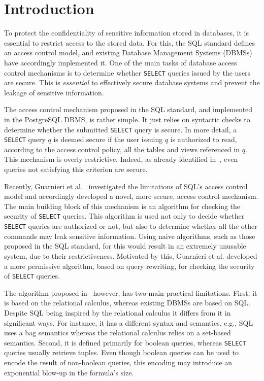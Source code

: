 \section{Introduction}
To protect the confidentiality of sensitive information stored in databases, it is essential to restrict access to the stored data.
%
For this, the SQL standard defines an access control model, and existing Database Management Systems (DBMSs) have accordingly implemented it. 
%
One of the main tasks of database access control mechanisms is to determine whether \texttt{SELECT} queries issued by the users are secure.
%
This is \emph{essential} to effectively secure database systems and prevent the leakage of sensitive information.

The access control mechanism proposed in the SQL standard, and implemented in the PostgreSQL DBMS, is rather simple.
%
It just relies on syntactic checks to determine whether the submitted \texttt{SELECT} query is secure.
%
In more detail, a \texttt{SELECT} query $q$ is deemed secure if the user issuing $q$ is authorized to read, according to the access control policy, all the tables and views referenced in $q$. %
%
This mechanism is overly restrictive.
%
Indeed, as already identified in~\cite{rizvi2004extending, guarnieri2014optimal, wang2007correctness,zhang2005authorizations}, even queries not satisfying this criterion are secure.

Recently, Guarnieri et al.~\cite{guarnieri2016strong} investigated the limitations of SQL's access control model and accordingly  developed a novel, more secure, access control mechanism.
%
The main building block of this mechanism is an algorithm for checking the security of \texttt{SELECT} queries.
%
This algorithm is used not only to decide whether \texttt{SELECT} queries are authorized or not, but also to determine whether all the other commands may leak sensitive information. 
%
Using naive algorithms, such as those proposed in the SQL standard, for this would result in an extremely unusable system, due to their restrictiveness.
%
Motivated by this, Guarnieri et al. developed a more permissive algorithm, based on query rewriting, for checking the security of \texttt{SELECT} queries.

The algorithm proposed in~\cite{guarnieri2016strong} however, has two main practical limitations.
%
First, it is based on the relational calculus, whereas existing DBMSs are based on SQL. Despite SQL being inspired by the relational calculus it differs from it in significant ways. For instance, it has a different syntax and semantics, e.g., SQL uses a bag semantics whereas the relational calculus relies on a set-based semantics.
%
Second, it is defined primarily for boolean queries, whereas \texttt{SELECT} queries usually retrieve tuples.
%
Even though boolean queries can be used to encode the result of non-boolean queries, this encoding may introduce an exponential blow-up in the formula's size.

